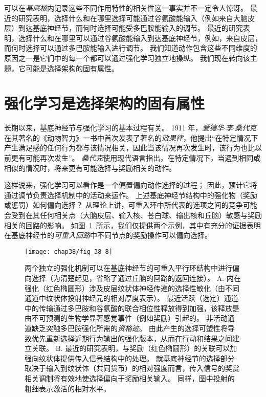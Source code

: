 可以在\textit{基底核}内记录这些不同作用特性的相关性这一事实并不一定令人惊讶。
最近的研究表明，选择什么和在哪里选择可能通过谷氨酸能输入（例如来自大脑皮层）到达基底神经节，而何时选择可能受多巴胺能输入的调节。
最近的研究表明，选择什么和在哪里可以通过谷氨酸能输入到达基底神经节，例如，来自皮层，而何时选择可以通过多巴胺能输入进行调节。
我们知道动作包含这些不同维度的原因之一是它们中的每一个都可以通过强化学习独立地操纵。
我们现在转向该主题，它可能是选择架构的固有属性。



\section{强化学习是选择架构的固有属性} \label{sec:38_7}

长期以来，基底神经节与强化学习的基本过程有关。
1911 年，\textit{爱德华$\cdot$李$\cdot$桑代克}在其著名的《动物智力》一书中首次发表了著名的\textit{效果律}，他提出“在特定情况下产生满足感的任何行为都与该情况相关，因此当该情况再次发生时，该行为也比以前更有可能再次发生”。
\textit{桑代克}使用现代语言指出，在特定情况下，当遇到相同或相似的情况时，将来更有可能选择与奖励相关的动作。


这样说来，强化学习可以看作是一个偏置偏向动作选择的过程；
因此，预计它将通过调节负责选择机制中的活动来运作。
上述基底神经节结构中的强化物（奖励或惩罚）如何偏向选择？
从理论上讲，可重入环中所代表的选项之间的竞争可能会受到在其任何相关点（大脑皮层、输入核、苍白球、输出核和丘脑）敏感与奖励相关的回路的影响。
如图~\ref{fig:38_8}~所示，我们仅提供两个示例，其中有充分的证据表明在基底神经节的\textit{可重入回路}中不同节点的奖励操作可以偏向选择。


\begin{figure}[htbp]
	\centering
	\texttt{[image: chap38/fig\_38\_8]}
	\caption{两个独立的强化机制可以在基底神经节的可重入平行环结构中进行偏向选择（为清楚起见，省略了通过丘脑的回路的返回连接）。
		A. 内在强化（红色椭圆形）涉及皮层纹状体神经传递的选择性敏化（由不同通道中纹状体投射神经元的相对厚度表示）。
		最近活跃（选定）通道中的传输通过多巴胺和谷氨酸的联合相位性释放得到加强，该释放是由不可预测的生物学显著感觉事件（例如奖励）引起的。
		非活动通道缺乏突触多巴胺强化所需的\textit{资格迹}。
		由此产生的选择可塑性将导致优先重新选择近期行为输出的强化版本，从而在行动和结果之间建立关联。
		B. 最近的研究表明，与奖励（红色椭圆形）的关联可以加强向纹状体提供传入信号结构中的处理。
		就基底神经节的选择部分取决于输入到纹状体（共同货币）的相对强度而言，传入信号的奖赏相关调制将有效地使选择偏向于奖励相关输入。
		同样，图中投射的粗细表示激活的相对水平。}
	\label{fig:38_8}
\end{figure}



